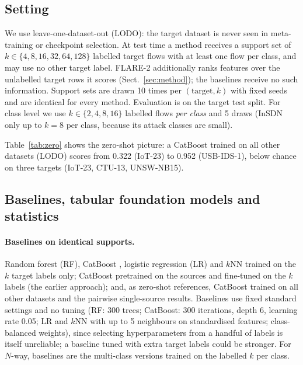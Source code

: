 \documentclass[11pt]{article}
\begin{document}
\subsection{Setting}
We use leave-one-dataset-out (LODO): the target dataset is never seen in meta-training or checkpoint selection.
At test time a method receives a support set of $k\in\{4,8,16,32,64,128\}$ labelled target flows with at least one flow per class, and may use no other target label. FLARE-2 additionally ranks features over the unlabelled target rows it scores (Sect.~\ref{sec:method}); the baselines receive no such information.
Support sets are drawn 10 times per $(\text{target},k)$ with fixed seeds and are identical for every method.
Evaluation is on the target test split.
For class level we use $k\in\{2,4,8,16\}$ labelled flows \emph{per class} and 5 draws (InSDN only up to $k=8$ per class, because its attack classes are small).


Table~\ref{tab:zero} shows the zero-shot picture: a CatBoost trained on all other datasets (LODO) scores from 0.322 (IoT-23) to 0.952 (USB-IDS-1), below chance on three targets (IoT-23, CTU-13, UNSW-NB15).

\begin{table}[t]
\centering\small
\caption{Zero-shot ROC-AUC on the target test split ($k=0$). LODO: CatBoost on all other datasets pooled. Pairwise: mean and best single source from the pairwise benchmark (not computed for CTU-13). Full label: CatBoost trained on the full target train split.}\label{tab:zero}

\end{table}

\subsection{Baselines, tabular foundation models and statistics}
\paragraph{Baselines on identical supports.}
Random forest (RF), CatBoost \citep{prokhorenkova2018catboost}, logistic regression (LR) and $k$NN trained on the $k$ target labels only; CatBoost pretrained on the sources and fine-tuned on the $k$ labels (the earlier approach); and, as zero-shot references, CatBoost trained on all other datasets and the pairwise single-source results.
Baselines use fixed standard settings and no tuning (RF: 300 trees; CatBoost: 300 iterations, depth 6, learning rate 0.05; LR and $k$NN with up to 5 neighbours on standardised features; class-balanced weights), since selecting hyperparameters from a handful of labels is itself unreliable; a baseline tuned with extra target labels could be stronger.
For $N$-way, baselines are the multi-class versions trained on the labelled $k$ per class.
\end{document}
